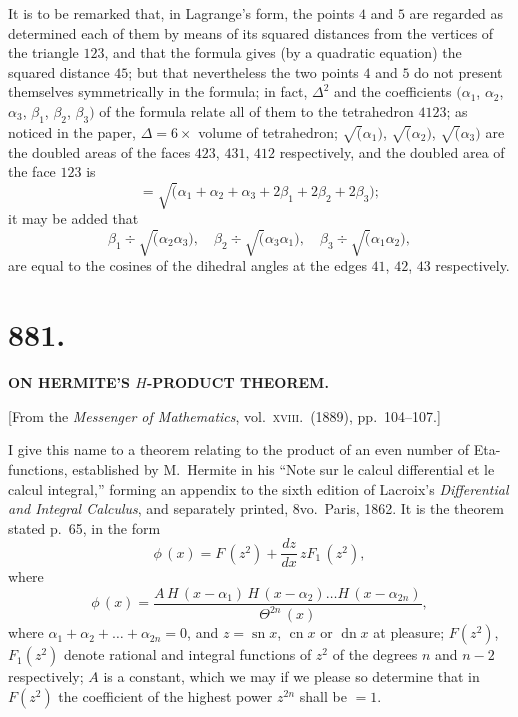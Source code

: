 \documentclass[11pt,a4paper]{book}
\begin{document}
It is to be remarked that, in Lagrange's form, the points $4$ and $5$ are regarded as determined each of them by means of its squared distances from the vertices of the triangle $123$, and that the formula gives (by a quadratic equation) the squared distance $45$; but that nevertheless the two points $4$ and $5$ do not present themselves symmetrically in the formula; in fact, $\Delta^2$ and the coefficients $(\alpha_1$, $\alpha_2$, $\alpha_3$, $\beta_1$, $\beta_2$, $\beta_3)$ of the formula relate all of them to the tetrahedron $4123$; as noticed in the paper, $\Delta = 6 \times$ volume of tetrahedron; $\surd(\alpha_1)$, $\surd(\alpha_2)$, $\surd(\alpha_3)$ are the doubled areas of the faces $423$, $431$, $412$ respectively, and the doubled area of the face $123$ is
\[ = \surd(\alpha_1 + \alpha_2 + \alpha_3 + 2\beta_1 + 2\beta_2 + 2\beta_3); \]
it may be added that
\[ \beta_1 \div \surd(\alpha_2 \alpha_3),\quad \beta_2 \div \surd(\alpha_3 \alpha_1),\quad \beta_3 \div \surd(\alpha_1 \alpha_2), \]
are equal to the cosines of the dihedral angles at the edges $41$, $42$, $43$ respectively.


\newpage
\section*{881.}

\begin{center}
\textbf{ON HERMITE'S $H$-PRODUCT THEOREM.}
\end{center}

\begin{center}
[From the \textit{Messenger of Mathematics}, vol.\ \textsc{xviii}.\ (1889), pp.\ 104--107.]
\end{center}

I give this name to a theorem relating to the product of an even number of Eta-functions, established by M.~Hermite in his ``Note sur le calcul differential et le calcul integral,'' forming an appendix to the sixth edition of Lacroix's \textit{Differential and Integral Calculus}, and separately printed, 8vo.\ Paris, 1862. It is the theorem stated p.~65, in the form
\[ \phi\,(x) = F\,(z^2) + \frac{dz}{dx}\, z F_1\,(z^2), \]
where
\[ \phi\,(x) = \frac{A\,H\,(x-\alpha_1)\, H\,(x-\alpha_2) \ldots H\,(x-\alpha_{2n})}{\Theta^{2n}\,(x)}, \]
where $\alpha_1 + \alpha_2 + \ldots + \alpha_{2n} = 0$, and $z = \operatorname{sn} x$, $\operatorname{cn} x$ or $\operatorname{dn} x$ at pleasure; $F(z^2)$, $F_1(z^2)$ denote rational and integral functions of $z^2$ of the degrees $n$ and $n-2$ respectively; $A$ is a constant, which we may if we please so determine that in $F(z^2)$ the coefficient of the highest power $z^{2n}$ shall be $=1$.
\end{document}
